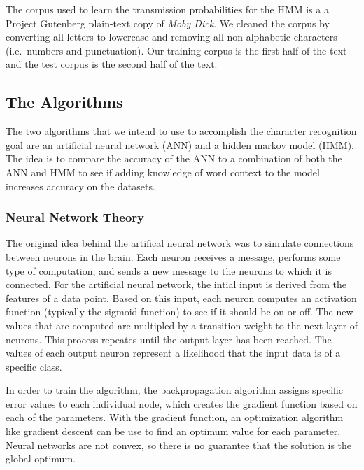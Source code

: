 \documentclass[11pt,a4paper,twocolumn]{article}
\begin{document}
The corpus used to learn the transmission probabilities for the HMM is a a Project Gutenberg
plain-text copy of \emph{Moby Dick}. We cleaned the corpus by converting all letters to lowercase
and removing all non-alphabetic characters (i.e.\ numbers and punctuation). Our training corpus is
the first half of the text and the test corpus is the second half of the text.

\subsection*{The Algorithms}

The two algorithms that we intend to use to accomplish the character recognition goal are an
artificial neural network (ANN) and a hidden markov model (HMM). The idea is to compare the accuracy
of the ANN to a combination of both the ANN and HMM to see if adding knowledge of word context to
the model increases accuracy on the datasets.

\subsubsection*{Neural Network Theory}

The original idea behind the artifical neural network was to simulate connections between neurons in
the brain. Each neuron receives a message, performs some type of computation, and sends a new
message to the neurons to which it is connected. For the artificial neural network, the intial input
is derived from the features of a data point. Based on this input, each neuron computes an
activation function (typically the sigmoid function) to see if it should be on or off. The new
values that are computed are multipled by a transition weight to the next layer of neurons. This
process repeates until the output layer has been reached. The values of each output neuron represent
a likelihood that the input data is of a specific class.

In order to train the algorithm, the backpropagation algorithm assigns specific error values to each
individual node, which creates the gradient function based on each of the parameters. With the
gradient function, an optimization algorithm like gradient descent can be use to find an optimum
value for each parameter. Neural networks are not convex, so there is no guarantee that the solution
is the global optimum.
\end{document}
